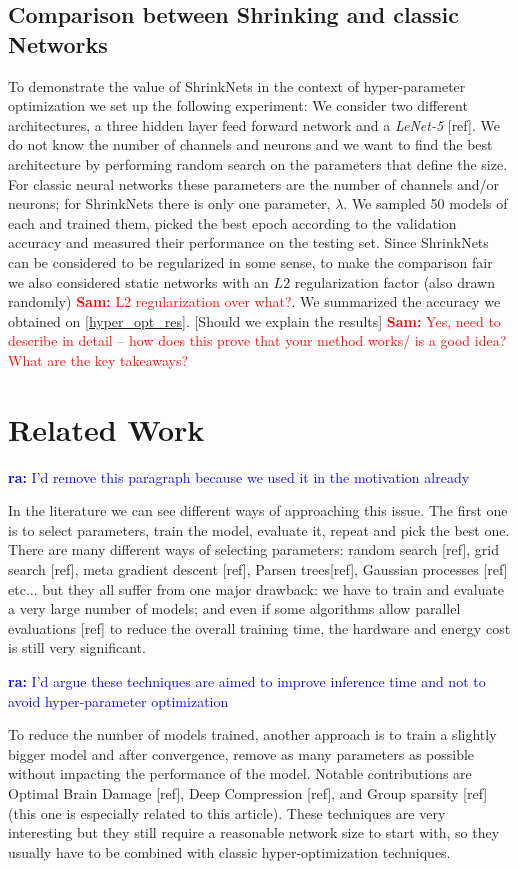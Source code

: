 \documentclass[sigconf]{acmart}
\newcommand{\srm}[1]{\textcolor{red}{{\bf Sam:} #1}}
\newcommand{\ra}[1]{\textcolor{blue}{{\bf ra:} #1}}
\begin{document}
\subsection{Comparison between Shrinking and classic Networks}

To demonstrate the value of ShrinkNets in the context of hyper-parameter
optimization we set up the following experiment: We consider two different
architectures, a three hidden layer feed forward network and a \textit{LeNet-5}
[ref]. We do not know the number of channels and neurons and we want to find the
best architecture by performing random search on the parameters that define the
size. For classic neural networks these parameters are the number of channels
and/or neurons; for ShrinkNets there is only one parameter, $\lambda$. We
sampled 50 models of each and trained them, picked the best epoch according to
the validation accuracy and measured their performance on the testing set. Since
ShrinkNets can be considered to be regularized in some sense, to make the
comparison fair we also considered static networks with an $L2$ regularization
factor (also drawn randomly) \srm{L2 regularization over what?}. We summarized
the accuracy we obtained on \autoref{hyper_opt_res}. [Should we explain the
results] \srm{Yes, need to describe in detail -- how does this prove that your
method works/ is a good idea?  What are the key takeaways?}

\section{Related Work}

\ra{I'd remove this paragraph because we used it in the motivation already}
\par In the literature we can see different ways of approaching this issue. The
first one is to select parameters, train the model, evaluate it, repeat and pick
the best one. There are many different ways of selecting parameters: random
search [ref], grid search [ref], meta gradient descent [ref], Parsen trees[ref],
Gaussian processes [ref] etc... but they all suffer from one major drawback: we
have to train and evaluate a very large number of models; and even if some
algorithms allow parallel evaluations [ref] to reduce the overall training time,
the hardware and energy cost is still very significant.  

\ra{I'd argue these techniques are aimed to improve inference time and not to
avoid hyper-parameter optimization}
\par To reduce the number of models trained, another approach is to train a
slightly bigger model and after convergence, remove as many parameters as
possible without impacting the performance of the model. Notable contributions
are Optimal Brain Damage [ref], Deep Compression [ref], and Group sparsity [ref]
(this one is especially related to this article). These techniques are very
interesting but they still require a reasonable network size to start with, so
they usually have to be combined with classic hyper-optimization techniques.  
\end{document}
